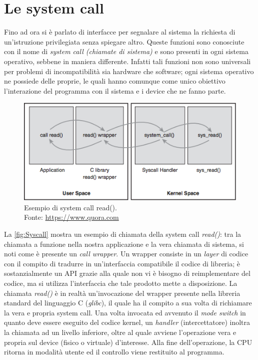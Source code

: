 \section{Le system call}

Fino ad ora si è parlato di interfacce per segnalare al sistema la richiesta di un'istruzione privilegiata senza spiegare altro. Queste funzioni sono conosciute con il nome di \emph{system call (chiamate di sistema)} e sono presenti in ogni sistema operativo, sebbene in maniera differente. Infatti tali funzioni non sono universali per problemi di incompatibilità sia hardware che software; ogni sistema operativo ne possiede delle proprie, le quali hanno comunque come unico obiettivo l'interazione del programma con il sistema e i device che ne fanno parte.

\begin{figure}[!ht]
\centering
\includegraphics[scale=0.7]{Figures/Syscall}
\caption[Esempio di system call read()]{Esempio di system call read().\\ Fonte: \href{https://www.quora.com/How-does-System-Call-return-data-back-to-user-space-in-Linux-Kernel}{https://www.quora.com}}
\label{fig:Syscall}
\end{figure}

La \autoref{fig:Syscall} mostra un esempio di chiamata della system call \emph{read()}: tra la chiamata a funzione nella nostra applicazione e la vera chiamata di sistema, si noti come è presente un \emph{call wrapper}. Un wrapper consiste in un \emph{layer} di codice con il compito di tradurre in un'interfaccia compatibile il codice di libreria; è sostanzialmente un API grazie alla quale non vi è bisogno di reimplementare del codice, ma si utilizza l'interfaccia che tale prodotto mette a disposizione.
La chiamata \emph{read()} è in realtà un'invocazione del wrapper presente nella libreria standard del linguaggio C (\emph{glibc}), il quale ha il compito a sua volta di richiamare la vera e propria system call.
Una volta invocata ed avvenuto il \emph{mode switch} in quanto deve essere eseguito del codice kernel, un \emph{handler} (intercettatore) inoltra la chiamata ad un livello inferiore, oltre al quale avviene l'operazione vera e propria sul device (fisico o virtuale) d'interesse. Alla fine dell'operazione, la CPU ritorna in modalità utente ed il controllo viene restituito al programma.

